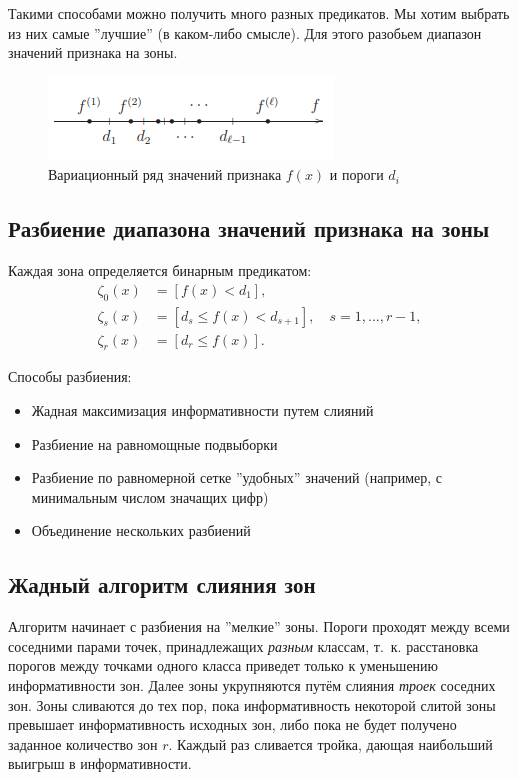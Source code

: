Такими способами можно получить много разных предикатов. Мы хотим выбрать из них самые ''лучшие'' (в каком-либо смысле). Для этого разобьем диапазон значений признака на зоны.

\begin{figure}
    \centering
    \includegraphics[scale = 1]{chapters/logical/images/bin1.png}
    \caption{Вариационный ряд значений признака $f(x)$ и пороги $d_i$}
\end{figure}

\subsection{Разбиение диапазона значений признака на зоны}

Каждая зона определяется бинарным предикатом:
\begin{align*}
    \zeta_0(x) & = [f(x) < d_1],                                       \\
    \zeta_s(x) & = [d_s \leq f(x) < d_{s+1}], \quad s = 1, \dots, r-1, \\
    \zeta_r(x) & = [d_r \leq f(x)].
\end{align*}

Способы разбиения:
\begin{itemize}
    \item Жадная максимизация информативности путем слияний
    \item Разбиение на равномощные подвыборки
    \item Разбиение по равномерной сетке ''удобных'' значений (например, с минимальным числом значащих цифр)
    \item Объединение нескольких разбиений
\end{itemize}

\subsection{Жадный алгоритм слияния зон}

Алгоритм начинает с разбиения на ''мелкие'' зоны. Пороги проходят между всеми соседними парами точек, принадлежащих \emph{разным} классам, т.~к. расстановка порогов между точками одного класса приведет только к уменьшению информативности зон. Далее зоны укрупняются путём слияния \emph{троек} соседних зон. Зоны сливаются до тех пор, пока
информативность некоторой слитой зоны превышает информативность
исходных зон, либо пока не будет получено заданное количество зон $r$. Каждый раз сливается тройка, дающая наибольший выигрыш в информативности.

